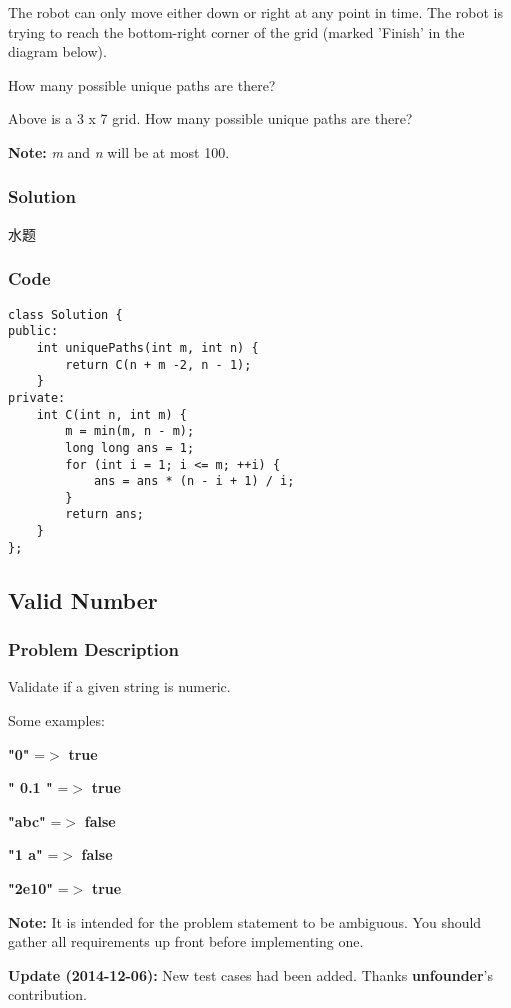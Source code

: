 \documentclass[courier]{article}
\begin{document}
\begin{CJK*}{UTF8}{gkai}
The robot can only move either down or right at any point in time. The robot is trying to reach the bottom-right corner of the grid (marked 'Finish' in the diagram below).

How many possible unique paths are there?

Above is a 3 x 7 grid. How many possible unique paths are there?

\textbf{Note:} \emph{m} and \emph{n} will be at most 100.



\subsubsection*{Solution}
水题

\subsubsection*{Code}
\begin{lstlisting}
class Solution {
public:
    int uniquePaths(int m, int n) {
        return C(n + m -2, n - 1);
    }
private:
    int C(int n, int m) {
        m = min(m, n - m);
        long long ans = 1;
        for (int i = 1; i <= m; ++i) {
            ans = ans * (n - i + 1) / i;
        }
        return ans;
    }
}; 
\end{lstlisting}


\subsection{ Valid Number }

\subsubsection*{Problem Description}
Validate if a given string is numeric.

Some examples:


\textbf{"0"} =$>$ \textbf{true}


\textbf{"   0.1  "} =$>$ \textbf{true}


\textbf{"abc"} =$>$ \textbf{false}


\textbf{"1 a"} =$>$ \textbf{false}


\textbf{"2e10"} =$>$ \textbf{true}

\textbf{Note:} It is intended for the problem statement to be ambiguous. You should gather all requirements up front before implementing one.

\textbf{Update (2014-12-06):}
New test cases had been added. Thanks \textbf{unfounder}'s contribution.




\end{CJK*}
\end{document}
